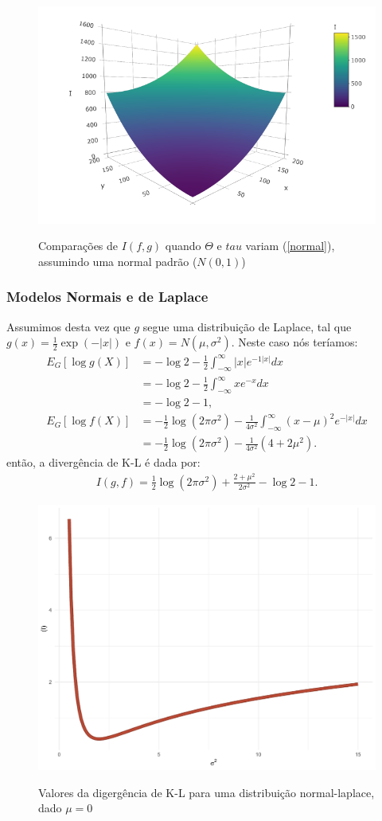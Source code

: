 \begin{figure}[!h]
    \centering
    \caption{Comparações de $I(f,g)$ quando $\Theta$ e $tau$ variam (\ref{normal}), assumindo uma normal padrão ($N(0, 1)$)}
    \includegraphics[width=.8\textwidth]{capitulos/figures/plot3d.png}
    \label{fig:normal}
\end{figure}

\subsubsection{Modelos Normais e de Laplace}
\label{laplace}

Assumimos desta vez que $g$ segue uma distribuição de Laplace, tal que $g(x) = \frac{1}{2}\exp(-|x|)$ e $f(x) = N(\mu, \sigma^2)$. Neste caso nós teríamos:
\begin{align*}
    E_G[\log g(X)] &= -\log 2 - \frac{1}{2}\int_{-\infty}^{\infty}|x|e^{-1|x|}dx\\
                   &= -\log 2 - \frac{1}{2}\int_{-\infty}^{\infty}xe^{-x}dx\\
                   &= -\log 2 -1,\\
    E_G[\log f(X)] &= -\frac{1}{2}\log(2\pi\sigma^2) - \frac{1}{4\sigma^2}\int_{-\infty}^{\infty}(x - \mu)^2e^{-|x|}dx\\
                   &= -\frac{1}{2}\log(2\pi\sigma^2) - \frac{1}{4\sigma^2}(4 + 2\mu^2).
\end{align*}
então, a divergência de K-L é dada por:
\begin{align*}
    I(g,f) = \frac{1}{2}\log(2\pi\sigma^2) + \frac{2 + \mu^2}{2\sigma^2} - \log 2 - 1.
\end{align*}

\begin{figure}[!h]
    \centering
    \caption{Valores da digergência de K-L para uma distribuição normal-laplace, dado $\mu = 0$}
    \includegraphics[width=.6\textwidth]{capitulos/figures/laplace.pdf}
    \label{fig:laplace}
\end{figure}

